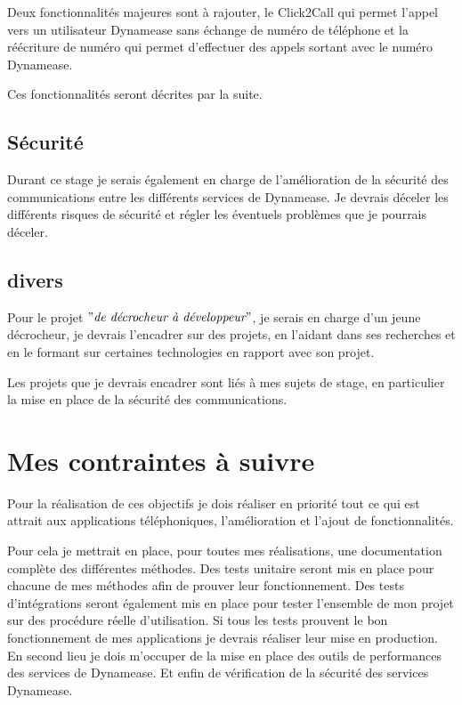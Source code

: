 Deux fonctionnalités majeures sont à rajouter, le Click2Call qui permet l'appel vers un utilisateur Dynamease sans échange de numéro de téléphone et la réécriture de numéro qui permet d'effectuer des appels sortant avec le  numéro Dynamease.

Ces fonctionnalités seront décrites par la suite.

\subsection{Sécurité}

Durant ce stage je serais également en charge de l'amélioration de la sécurité des communications entre les différents services de Dynamease. Je devrais déceler les différents risques de sécurité et régler les éventuels problèmes que je pourrais déceler.

\subsection{divers}

Pour le projet $"\textit{de décrocheur à développeur}"$, je serais en charge d'un jeune décrocheur, je devrais l'encadrer sur des projets, en l'aidant dans ses recherches et en le formant sur certaines technologies en rapport avec son projet.

Les projets que je devrais encadrer sont liés à mes sujets de stage, en particulier la mise en place de la sécurité des communications.

\section{Mes contraintes à suivre}

Pour la réalisation de ces objectifs je dois réaliser en priorité tout ce qui est attrait aux applications téléphoniques, l'amélioration et l'ajout de fonctionnalités.

Pour cela je mettrait en place, pour toutes mes réalisations, une documentation complète des différentes méthodes. Des tests unitaire seront mis en place pour chacune de mes méthodes afin de prouver leur fonctionnement. Des tests d'intégrations seront également mis en place pour tester l'ensemble de mon projet sur des procédure réelle d'utilisation. Si tous les tests prouvent le bon fonctionnement de mes applications je devrais réaliser leur mise en production.\\

En second lieu je dois m'occuper de la mise en place des outils de performances des services de Dynamease. Et enfin de vérification de la sécurité des services Dynamease.